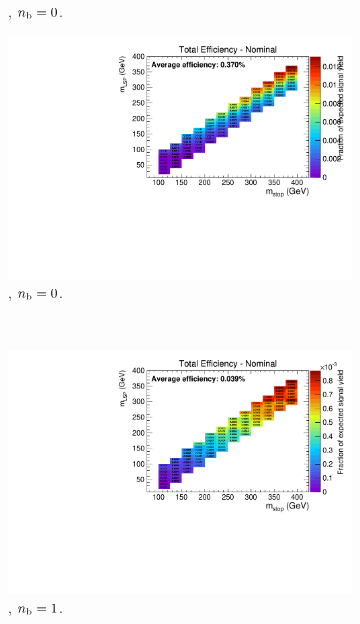\begin{figure}[ht!]
\begin{subfigure}[b]{0.32\textwidth}
    \caption{\njlow, $n_{\text{b}} = 0$.}
  \end{subfigure}
  \begin{subfigure}[b]{0.32\textwidth}
    \includegraphics[width=\textwidth, page=6]{Figs/sms/t2degen/v5/JES_T2_4body_v5_eq0b_le3j_incl.pdf}
    \caption{\njlow, $n_{\text{b}} = 0$.}
    \label{fig:sms-jes-tdegen-le3j-0b}
  \end{subfigure}\\
  \begin{subfigure}[b]{0.32\textwidth}
    \includegraphics[width=\textwidth, page=4]{Figs/sms/t2degen/v5/JES_T2_4body_v5_eq1b_le3j_incl.pdf}
    \caption{\njlow, $n_{\text{b}} = 1$.}
  \end{subfigure}
  \begin{subfigure}[b]{0.32\textwidth}

\end{subfigure}
\end{figure}
